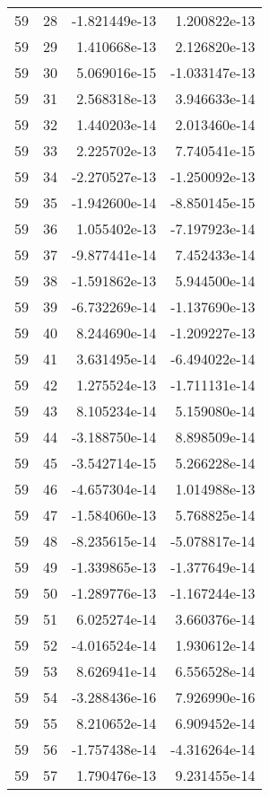\begin{tabular}{rrrr}
  59 &   28 & -1.821449e-13 &  1.200822e-13 \\
  59 &   29 &  1.410668e-13 &  2.126820e-13 \\
  59 &   30 &  5.069016e-15 & -1.033147e-13 \\
  59 &   31 &  2.568318e-13 &  3.946633e-14 \\
  59 &   32 &  1.440203e-14 &  2.013460e-14 \\
  59 &   33 &  2.225702e-13 &  7.740541e-15 \\
  59 &   34 & -2.270527e-13 & -1.250092e-13 \\
  59 &   35 & -1.942600e-14 & -8.850145e-15 \\
  59 &   36 &  1.055402e-13 & -7.197923e-14 \\
  59 &   37 & -9.877441e-14 &  7.452433e-14 \\
  59 &   38 & -1.591862e-13 &  5.944500e-14 \\
  59 &   39 & -6.732269e-14 & -1.137690e-13 \\
  59 &   40 &  8.244690e-14 & -1.209227e-13 \\
  59 &   41 &  3.631495e-14 & -6.494022e-14 \\
  59 &   42 &  1.275524e-13 & -1.711131e-14 \\
  59 &   43 &  8.105234e-14 &  5.159080e-14 \\
  59 &   44 & -3.188750e-14 &  8.898509e-14 \\
  59 &   45 & -3.542714e-15 &  5.266228e-14 \\
  59 &   46 & -4.657304e-14 &  1.014988e-13 \\
  59 &   47 & -1.584060e-13 &  5.768825e-14 \\
  59 &   48 & -8.235615e-14 & -5.078817e-14 \\
  59 &   49 & -1.339865e-13 & -1.377649e-14 \\
  59 &   50 & -1.289776e-13 & -1.167244e-13 \\
  59 &   51 &  6.025274e-14 &  3.660376e-14 \\
  59 &   52 & -4.016524e-14 &  1.930612e-14 \\
  59 &   53 &  8.626941e-14 &  6.556528e-14 \\
  59 &   54 & -3.288436e-16 &  7.926990e-16 \\
  59 &   55 &  8.210652e-14 &  6.909452e-14 \\
  59 &   56 & -1.757438e-14 & -4.316264e-14 \\
  59 &   57 &  1.790476e-13 &  9.231455e-14 \\

\end{tabular}
